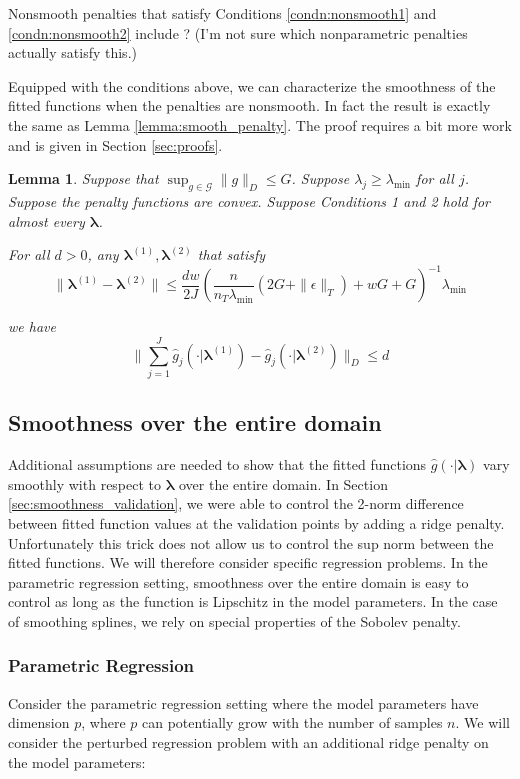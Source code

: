 \documentclass[12pt]{article}
\newtheorem{lemma}{Lemma}
\begin{document}
Nonsmooth penalties that satisfy Conditions \ref{condn:nonsmooth1} and \ref{condn:nonsmooth2} include ? (I'm not sure which nonparametric penalties actually satisfy this.)

Equipped with the conditions above, we can characterize the smoothness of the fitted functions when the penalties are nonsmooth. In fact the result is exactly the same as Lemma \ref{lemma:smooth_penalty}. The proof requires a bit more work and is given in Section \ref{sec:proofs}. 

\begin{lemma}
\label{lemma:nonsmooth}
Suppose that $\sup_{g\in\mathcal{G}}\|g\|_{D}\le G$.
Suppose $\lambda_j \ge \lambda_{\min}$ for all $j$.
Suppose the penalty functions are convex.
Suppose Conditions 1 and 2 hold for almost every $\boldsymbol{\lambda}$.

For all $d>0$, any $\boldsymbol \lambda^{(1)}, \boldsymbol \lambda^{(2)}$ that satisfy 
\[
\|\boldsymbol \lambda^{(1)}- \boldsymbol \lambda^{(2)}\|\le\frac{dw}{2J}\left(\frac{n}{n_T \lambda_{\min} }\left(2G+\|\epsilon\|_{T}\right)+wG+G\right)^{-1}\lambda_{\min}
\]

we have
\[
\|\sum_{j=1}^{J}\hat{g}_{j}(\cdot| \boldsymbol \lambda^{(1)})-\hat{g}_{j}(\cdot| \boldsymbol \lambda^{(2)})\|_{D}\le d
\]
\end{lemma}

\subsection{Smoothness over the entire domain}
\label{sec:smoothness_domain}

Additional assumptions are needed to show that the fitted functions $\hat{g}(\cdot | \boldsymbol \lambda)$ vary smoothly with respect to $\boldsymbol \lambda$ over the entire domain. In Section \ref{sec:smoothness_validation}, we were able to control the 2-norm difference between fitted function values at the validation points by adding a ridge penalty. Unfortunately this trick does not allow us to control the sup norm between the fitted functions. We will therefore consider specific regression problems. In the parametric regression setting, smoothness over the entire domain is easy to control as long as the function is Lipschitz in the model parameters. In the case of smoothing splines, we rely on special properties of the Sobolev penalty.

\subsubsection{Parametric Regression}
Consider the parametric regression setting where the model parameters have dimension $p$, where $p$ can potentially grow with the number of samples $n$. We will consider the perturbed regression problem with an additional ridge penalty on the model parameters:
\end{document}
